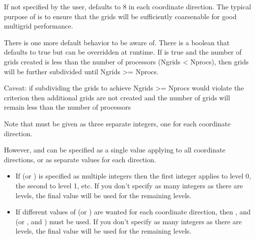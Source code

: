 \documentclass[letterpaper,10pt,english]{sphinxmanual}
\begin{document}
\sphinxAtStartPar
If not specified by the user,  defaults to 8 in each coordinate direction.
The typical purpose of  is to ensure that the grids will be
sufficiently coarsenable for good multigrid performance.

\sphinxAtStartPar
There is one more default behavior to be aware of.  There is a boolean 
that defaults to true but can be over\sphinxhyphen{}ridden at run\sphinxhyphen{}time.
If  is true and the number of grids created is less than the number of processors
(Ngrids \textless{} Nprocs), then grids will be further subdivided until Ngrids \textgreater{}= Nprocs.

\sphinxAtStartPar
Caveat: if subdividing the grids to achieve Ngrids \textgreater{}= Nprocs would violate the
 criterion then additional grids are not created and the
number of grids will remain less than the number of processors

\sphinxAtStartPar
Note that  must be given as three separate integers, one for each coordinate direction.

\sphinxAtStartPar
However,  and  can be specified as a single value
applying to all coordinate directions, or as separate values for each direction.
\begin{itemize}
\item {} 
\sphinxAtStartPar
If  (or ) is specified as multiple integers then the first
integer applies to level 0, the second to level 1, etc.  If you don’t specify as many
integers as there are levels, the final value will be used for the remaining levels.

\item {} 
\sphinxAtStartPar
If different values of  (or ) are wanted for each coordinate direction,
then ,  and 
(or ,  and ) must be used.
If you don’t specify as many integers as there are levels, the final value will be used for the remaining levels.

\end{itemize}
\end{document}
